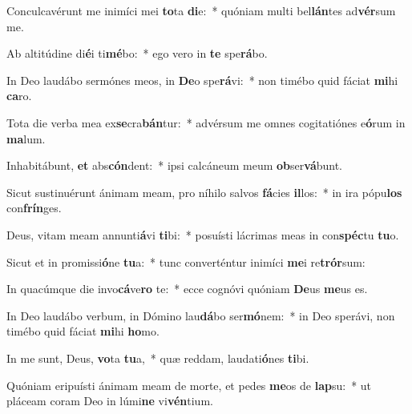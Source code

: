 \item Conculcavérunt me inimíci mei \textbf{to}ta \textbf{di}e:~* quóniam multi bel\textbf{lán}tes ad\textbf{vér}sum me.
\item Ab altitúdine di\textbf{é}i ti\textbf{mé}bo:~* ego vero in \textbf{te} spe\textbf{rá}bo.
\item In Deo laudábo sermónes meos, in \textbf{De}o spe\textbf{rá}vi:~* non timébo quid fáciat \textbf{mi}hi \textbf{ca}ro.
\item Tota die verba mea ex\textbf{se}cra\textbf{bán}tur:~* advérsum me omnes cogitatiónes e\textbf{ó}rum in \textbf{ma}lum.
\item Inhabitábunt, \textbf{et} abs\textbf{cón}dent:~* ipsi calcáneum meum \textbf{ob}ser\textbf{vá}bunt.
\item Sicut sustinuérunt ánimam meam, pro níhilo salvos \textbf{fá}cies \textbf{il}los:~* in ira pópu\textbf{los} con\textbf{frín}ges.
\item Deus, vitam meam annunti\textbf{á}vi \textbf{ti}bi:~* posuísti lácrimas meas in con\textbf{spéc}tu \textbf{tu}o.
\item Sicut et in promissi\textbf{ó}ne \textbf{tu}a:~* tunc converténtur inimíci \textbf{me}i re\textbf{trór}sum:
\item In quacúmque die invo\textbf{cá}ve\textbf{ro} te:~* ecce cognóvi quóniam \textbf{De}us \textbf{me}us es.
\item In Deo laudábo verbum, in Dómino lau\textbf{dá}bo ser\textbf{mó}nem:~* in Deo sperávi, non timébo quid fáciat \textbf{mi}hi \textbf{ho}mo.
\item In me sunt, Deus, \textbf{vo}ta \textbf{tu}a,~* quæ reddam, laudati\textbf{ó}nes \textbf{ti}bi.
\item Quóniam eripuísti ánimam meam de morte, et pedes \textbf{me}os de \textbf{lap}su:~* ut pláceam coram Deo in lúmi\textbf{ne} vi\textbf{vén}tium.
